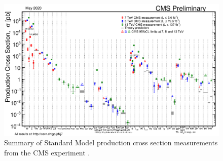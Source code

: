 \begin{figure}
\centering
\includegraphics[width=\textwidth]{figures/intro/cms_sm_measurements.png}
\caption{Summary of Standard Model production cross section measurements from the CMS experiment \cite{cms_sm_public_results}.}
\label{cms_sm_measurements}
\end{figure}
